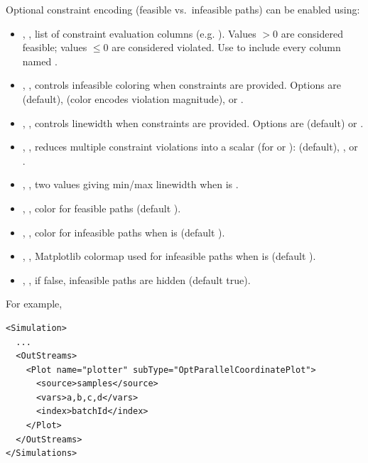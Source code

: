 Optional constraint encoding (feasible vs.\ infeasible paths) can be enabled using:
\begin{itemize}
  \item {}, , list of constraint evaluation columns (e.g. ).
        Values $> 0$ are considered feasible; values $\le 0$ are considered violated. Use  to include every column named .
  \item {}, , controls infeasible coloring when constraints are provided. Options are  (default),
         (color encodes violation magnitude), or .
  \item {}, , controls linewidth when constraints are provided. Options are  (default) or .
  \item {}, , reduces multiple constraint violations into a scalar (for  or ):  (default), , or .
  \item {}, , two values giving min/max linewidth when  is .
  \item {}, , color for feasible paths (default ).
  \item {}, , color for infeasible paths when  is  (default ).
  \item {}, , Matplotlib colormap used for infeasible paths when  is  (default ).
  \item {}, , if false, infeasible paths are hidden (default true).
\end{itemize}

For example,
\begin{lstlisting}[style=XML]
<Simulation>
  ...
  <OutStreams>
    <Plot name="plotter" subType="OptParallelCoordinatePlot">
      <source>samples</source>
      <vars>a,b,c,d</vars>
      <index>batchId</index>
    </Plot>
  </OutStreams>
</Simulations>
\end{lstlisting}

